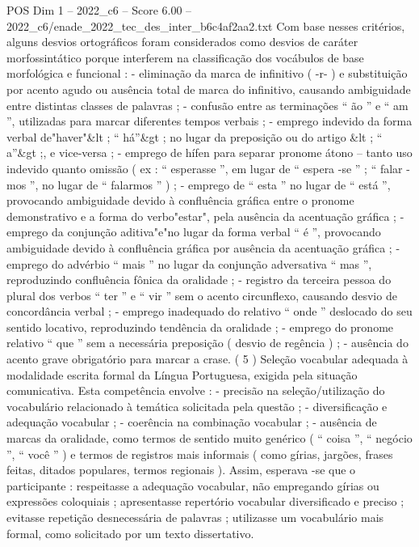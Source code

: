 \begin{textsample}{POS Dim 1 – 2022\_c6 – Score 6.00 – 2022\_c6/enade\_2022\_tec\_des\_inter\_b6c4af2aa2.txt}
Com base nesses critérios, alguns desvios ortográficos foram considerados como desvios de caráter morfossintático porque interferem na classificação dos vocábulos de base morfológica e funcional : - eliminação da marca de infinitivo ( -r- ) e substituição por acento agudo ou ausência total de marca do infinitivo, causando ambiguidade entre distintas classes de palavras ; - confusão entre as terminações “ ão ” e “ am ”, utilizadas para marcar diferentes tempos verbais ; - emprego indevido da forma verbal de"haver"\&lt ; “ há”\&gt ; no lugar da preposição ou do artigo \&lt ; “ a”\&gt ;, e vice-versa ; - emprego de hífen para separar pronome átono – tanto uso indevido quanto omissão ( ex : “ esperasse ”, em lugar de “ espera -se ” ; “ falar -mos ”, no lugar de “ falarmos ” ) ; - emprego de “ esta ” no lugar de “ está ”, provocando ambiguidade devido à confluência gráfica entre o pronome demonstrativo e a forma do verbo"estar", pela ausência da acentuação gráfica ; - emprego da conjunção aditiva"e"no lugar da forma verbal “ é ”, provocando ambiguidade devido à confluência gráfica por ausência da acentuação gráfica ; - emprego do advérbio “ mais ” no lugar da conjunção adversativa “ mas ”, reproduzindo confluência fônica da oralidade ; - registro da terceira pessoa do plural dos verbos “ ter ” e “ vir ” sem o acento circunflexo, causando desvio de concordância verbal ; - emprego inadequado do relativo “ onde ” deslocado do seu sentido locativo, reproduzindo tendência da oralidade ; - emprego do pronome relativo “ que ” sem a necessária preposição ( desvio de regência ) ; - ausência do acento grave obrigatório para marcar a crase. ( 5 ) Seleção vocabular adequada à modalidade escrita formal da Língua Portuguesa, exigida pela situação comunicativa.
Esta competência envolve : - precisão na seleção/utilização do vocabulário relacionado à temática solicitada pela questão ; - diversificação e adequação vocabular ; - coerência na combinação vocabular ; - ausência de marcas da oralidade, como termos de sentido muito genérico ( “ coisa ”, “ negócio ”, “ você ” ) e termos de registros mais informais ( como gírias, jargões, frases feitas, ditados populares, termos regionais ).
Assim, esperava -se que o participante : respeitasse a adequação vocabular, não empregando gírias ou expressões coloquiais ; apresentasse repertório vocabular diversificado e preciso ; evitasse repetição desnecessária de palavras ; utilizasse um vocabulário mais formal, como solicitado por um texto dissertativo.

\end{textsample}
